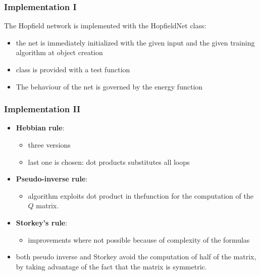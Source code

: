\documentclass{beamer}
\begin{document}
\begin{frame}
\frametitle{Implementation I}
The Hopfield network is implemented with the HopfieldNet class:
\begin{itemize}
\item the net is immediately initialized with the given input and the given training algorithm at object creation
\item class is provided with a test function
\item The behaviour of the net is governed by the energy function
\end{itemize}
\end{frame}


\begin{frame}
\frametitle{Implementation II}
\begin{itemize}
\item \textbf{Hebbian rule}:
\begin{itemize}
\item three versions
\item last one is chosen: dot products substitutes all loops
\end{itemize}
\item \textbf{Pseudo-inverse rule}:
\begin{itemize}
\item algorithm exploits dot product in thefunction for the computation of the $Q$ matrix.
\end{itemize}
\item \textbf{Storkey's rule}:
\begin{itemize}
\item improvements where not possible because of complexity of the formulas
\end{itemize}
\item both pseudo inverse and Storkey avoid the computation of half of the matrix, by taking advantage of the fact that the matrix is symmetric.
\end{itemize}
\end{frame}

%
\end{document}
